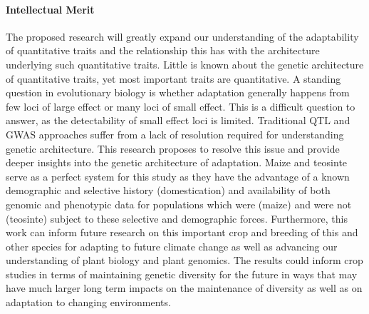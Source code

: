 \vspace{-0.4cm}

\paragraph{Intellectual Merit}  



The proposed research will greatly expand our understanding of the adaptability of quantitative traits and the relationship this has with the architecture underlying such quantitative traits. Little is known about the genetic architecture of quantitative traits, yet most important traits are quantitative. A standing question in evolutionary biology is whether adaptation generally happens from few loci of large effect or many loci of small effect. This is a difficult question to answer, as the detectability of small effect loci is limited. Traditional QTL and GWAS approaches suffer from a lack of resolution required for understanding genetic architecture. This research proposes to resolve this issue and provide deeper insights into the genetic architecture of adaptation. Maize and teosinte  serve as a perfect system for this study as they have the advantage of a known demographic and selective history (domestication) and availability of both genomic and phenotypic data for populations which were (maize) and were not (teosinte) subject to these selective and demographic forces. Furthermore, this work can inform future research on this important crop and breeding of this and other species for adapting to future climate change as well as advancing our understanding of plant biology and plant genomics. The results could inform crop studies in terms of maintaining genetic diversity for the future in ways that may have much larger long term impacts on the maintenance of diversity as well as on adaptation to changing environments.

